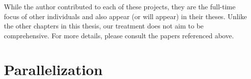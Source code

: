 While the author contributed to each of these projects, they are the
full-time focus of other individuals and also appear (or will appear)
in their theses.  Unlike the other chapters in this thesis, our
treatment does not aim to be comprehensive.  For more details, please
consult the papers referenced above.

\section{Parallelization}






